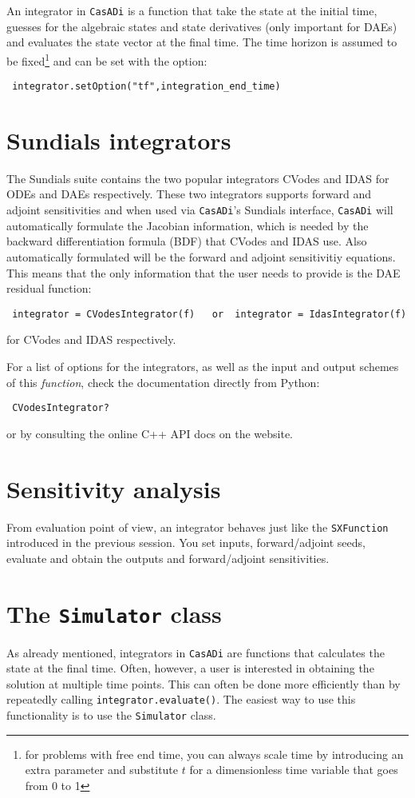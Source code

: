 \documentclass[a4paper,12pt]{book}
\newcommand{\CasADi}{\texttt{CasADi}\xspace}
\begin{document}
An integrator in \CasADi is a function that take the state at the initial time, guesses for the algebraic states and state derivatives (only important for DAEs) and evaluates the state vector at the final time. The time horizon is assumed to be fixed\footnote{for problems with free end time, you can always scale time by introducing an extra parameter and substitute $t$ for a dimensionless time variable that goes from 0 to 1} and can be set with the option:
\begin{verbatim}
 integrator.setOption("tf",integration_end_time)
\end{verbatim}

\section{Sundials integrators}
The Sundials suite contains the two popular integrators CVodes and IDAS for ODEs and DAEs respectively. These two integrators supports forward and adjoint sensitivities and when used via \CasADi's Sundials interface, \CasADi will automatically formulate the Jacobian information, which is needed by the backward differentiation formula (BDF) that CVodes and IDAS use. Also automatically formulated will be the forward and adjoint sensitivitiy equations. This means that the only information that the user needs to provide is the DAE residual function:
\begin{verbatim}
 integrator = CVodesIntegrator(f)   or  integrator = IdasIntegrator(f)
\end{verbatim}
for CVodes and IDAS respectively.

For a list of options for the integrators, as well as the input and output schemes of this \emph{function}, check the documentation directly from Python:
\begin{verbatim}
 CVodesIntegrator?
\end{verbatim}
or by consulting the online C++ API docs on the website.

\section{Sensitivity analysis}
From evaluation point of view, an integrator behaves just like the \texttt{SXFunction} introduced in the previous session. You set inputs, forward/adjoint seeds, evaluate and obtain the outputs and forward/adjoint sensitivities.

\section{The \texttt{Simulator} class}
As already mentioned, integrators in \CasADi are functions that calculates the state at the final time. Often, however, a user is interested in obtaining the solution at multiple time points. This can often be done more efficiently than by repeatedly calling \texttt{integrator.evaluate()}. The easiest way to use this functionality is to use the \texttt{Simulator} class.
\end{document}
